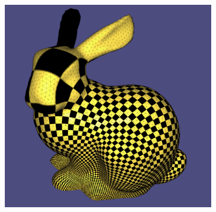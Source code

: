 \begin{figure}
\begin{subfigure}{0.25\textwidth}
\caption{}
\end{subfigure}\ \ \ \ \ \ \ \ \ 
\begin{subfigure}{0.25\textwidth}
\includegraphics[height = \textwidth]{images/bunny_polygon_texture}
\caption{}
\end{subfigure}


\end{figure}
